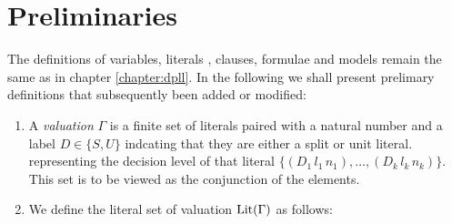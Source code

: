 \section{Preliminaries}
The definitions of variables, literals , clauses, formulae and models remain the same as in chapter \ref{chapter:dpll}. In the following we shall present prelimary definitions that subsequently been added or modified: \\
%
%
\begin{mydef}
\hspace{3mm}
\begin{enumerate}

%
%
%
%
%
%
%
\item A \emph{valuation} $\Gamma$ is a finite set of literals paired with a natural number and a label $D \in \{S, U\}$ indcating that they are either a split or unit literal. representing the decision level of that literal $\{ (D_1 \, l_1 \, n_1), \ldots , ( D_k \, l_k \, n_k) \}$. This set is to be viewed as the conjunction of the elements.
%
\item We define the literal set of valuation $\mathrm{Lit}(\Gamma)$ as follows:

\end{enumerate}
\end{mydef}
